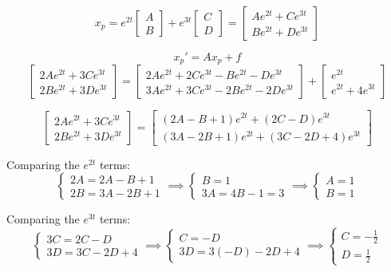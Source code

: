 \documentclass[12pt]{article}
\begin{document}
\[x_p = e^{2t} \begin{bmatrix}
    A\\B
\end{bmatrix} + e^{3t} \begin{bmatrix}
    C\\D
\end{bmatrix} = \begin{bmatrix}
    Ae^{2t} + Ce^{3t}\\
    Be^{2t} + De^{3t}
\end{bmatrix}\]

\[x_p' = Ax_p + f\]
\[\begin{bmatrix}
    2Ae^{2t} + 3Ce^{3t}\\
    2Be^{2t} + 3De^{3t}
\end{bmatrix} = \begin{bmatrix}
    2Ae^{2t} + 2Ce^{3t} - Be^{2t} - De^{3t}\\
    3Ae^{2t} + 3Ce^{3t} - 2Be^{2t} - 2De^{3t}
\end{bmatrix} + \begin{bmatrix}
    e^{2t}\\
    e^{2t} + 4e^{3t}
\end{bmatrix}\]

\[\begin{bmatrix}
    2Ae^{2t} + 3Ce^{3t}\\
    2Be^{2t} + 3De^{3t}
\end{bmatrix} = \begin{bmatrix}
    (2A - B + 1)e^{2t} + (2C - D)e^{3t}\\
    (3A - 2B + 1)e^{2t} + (3C - 2D + 4)e^{3t}
\end{bmatrix}\]

Comparing the $e^{2t}$ terms:
\[\begin{cases}
    2A = 2A - B + 1\\
    2B = 3A - 2B + 1
\end{cases} \implies \begin{cases}
    B = 1\\
    3A = 4B - 1 = 3 
\end{cases} \implies \begin{cases}
    A = 1\\
    B = 1
\end{cases}\]

Comparing the $e^{3t}$ terms:
\[\begin{cases}
    3C = 2C - D\\
    3D = 3C - 2D + 4
\end{cases} \implies \begin{cases}
    C = -D\\
    3D = 3(-D) - 2D + 4
\end{cases} \implies \begin{cases}
    C = -\frac{1}{2}\\
    D = \frac{1}{2}
\end{cases}\]
\end{document}
